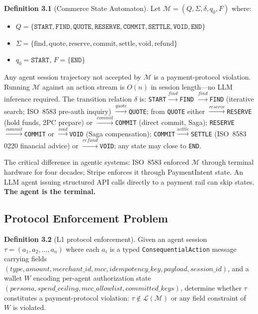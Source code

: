 \documentclass{article}
\begin{document}
\textbf{Definition 3.1} (Commerce State Automaton). Let
$\mathcal{M} = (Q, \Sigma, \delta, q_0, F)$ where:
\begin{itemize}
\item $Q = \{\texttt{START}, \texttt{FIND}, \texttt{QUOTE}, \texttt{RESERVE},
  \texttt{COMMIT}, \texttt{SETTLE}, \texttt{VOID}, \texttt{END}\}$
\item $\Sigma = \{\text{find}, \text{quote}, \text{reserve}, \text{commit},
  \text{settle}, \text{void}, \text{refund}\}$
\item $q_0 = \texttt{START}$, $F = \{\texttt{END}\}$
\end{itemize}

Any agent session trajectory not accepted by $\mathcal{M}$ is a
payment-protocol violation. Running $\mathcal{M}$ against an action stream is
$O(n)$ in session length---no LLM inference required.
The transition relation $\delta$ is: \texttt{START}$\xrightarrow{\textit{find}}$\texttt{FIND}
$\xrightarrow{\textit{find}}$\texttt{FIND} (iterative search; ISO~8583 pre-auth inquiry)
$\xrightarrow{\textit{quote}}$\texttt{QUOTE}; from \texttt{QUOTE} either
$\xrightarrow{\textit{reserve}}$\texttt{RESERVE} (hold funds, 2PC prepare) or
$\xrightarrow{\textit{commit}}$\texttt{COMMIT} (direct commit, Saga);
\texttt{RESERVE}$\xrightarrow{\textit{commit}}$\texttt{COMMIT} or
$\xrightarrow{\textit{void}}$\texttt{VOID} (Saga compensation);
\texttt{COMMIT}$\xrightarrow{\textit{settle}}$\texttt{SETTLE} (ISO~8583 0220 financial advice) or
$\xrightarrow{\textit{refund}}$\texttt{VOID}; any state may close to \texttt{END}.


The critical difference in agentic systems: ISO~8583 enforced $\mathcal{M}$
through terminal hardware for four decades; Stripe enforces it through
PaymentIntent state. An LLM agent issuing structured API calls directly to a
payment rail can skip states. \textbf{The agent is the terminal.}

\subsection{Protocol Enforcement Problem}

\textbf{Definition 3.2} (L1 protocol enforcement). Given an agent session
$\tau = (a_1, a_2, \ldots, a_n)$ where each $a_i$ is a typed
\texttt{ConsequentialAction} message carrying fields
$(type, amount, merchant\_id, mcc, idempotency\_key, payload, session\_id)$,
and a wallet $W$ encoding per-agent authorization state $(persona, spend\_ceiling,
mcc\_allowlist, committed\_keys)$, determine whether $\tau$ constitutes a
payment-protocol violation: $\tau \notin \mathcal{L}(\mathcal{M})$ or any field
constraint of $W$ is violated.
\end{document}
